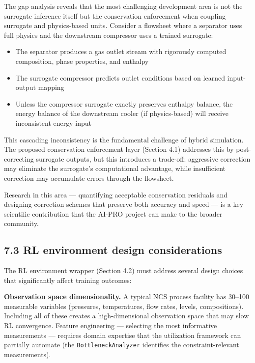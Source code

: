 \documentclass[review,3p]{custom}
\begin{document}
The gap analysis reveals that the most challenging development area is not the surrogate inference itself but the conservation enforcement when coupling surrogate and physics-based units. Consider a flowsheet where a separator uses full physics and the downstream compressor uses a trained surrogate:

\begin{itemize}
  \item The separator produces a gas outlet stream with rigorously computed composition, phase properties, and enthalpy
  \item The surrogate compressor predicts outlet conditions based on learned input-output mapping
  \item Unless the compressor surrogate exactly preserves enthalpy balance, the energy balance of the downstream cooler (if physics-based) will receive inconsistent energy input
\end{itemize}

This cascading inconsistency is the fundamental challenge of hybrid simulation. The proposed conservation enforcement layer (Section 4.1) addresses this by post-correcting surrogate outputs, but this introduces a trade-off: aggressive correction may eliminate the surrogate's computational advantage, while insufficient correction may accumulate errors through the flowsheet.

Research in this area --- quantifying acceptable conservation residuals and designing correction schemes that preserve both accuracy and speed --- is a key scientific contribution that the AI-PRO project can make to the broader community.

\subsection{7.3 RL environment design considerations}

The RL environment wrapper (Section 4.2) must address several design choices that significantly affect training outcomes:

\textbf{Observation space dimensionality.} A typical NCS process facility has 30--100 measurable variables (pressures, temperatures, flow rates, levels, compositions). Including all of these creates a high-dimensional observation space that may slow RL convergence. Feature engineering --- selecting the most informative measurements --- requires domain expertise that the utilization framework can partially automate (the \texttt{BottleneckAnalyzer} identifies the constraint-relevant measurements).
\end{document}
